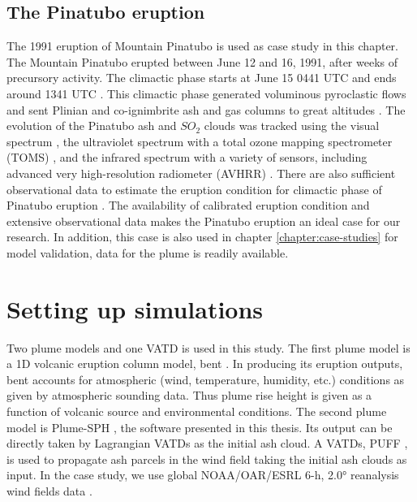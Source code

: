 \subsection{The Pinatubo eruption}

The 1991 eruption of Mountain Pinatubo is used as case study in this chapter. The Mountain Pinatubo erupted between June 12 and 16, 1991, after weeks of precursory activity. The climactic phase starts at June 15 0441 UTC and ends around 1341 UTC \citep{holasek1996satellite}. This climactic phase generated voluminous pyroclastic flows and sent Plinian and co-ignimbrite ash and gas columns to great altitudes \citep{scott1996pyroclastic}. The evolution of the Pinatubo ash and $SO_2$ clouds was tracked using the visual spectrum \citep{holasek1996satellite}, the ultraviolet spectrum with a total ozone mapping spectrometer (TOMS) \citep{guo2004re}, and the infrared spectrum with a variety of sensors, including advanced very high-resolution radiometer (AVHRR) \citep{guo2004particles}. There are also sufficient observational data to estimate the eruption condition for climactic phase of Pinatubo eruption \citep{suzuki2009three}. The availability of calibrated eruption condition and extensive observational data makes the Pinatubo eruption an ideal case for our research. In addition, this case is also used in chapter \ref{chapter:case-studies} for model validation, data for the plume is readily available.

\section{Setting up simulations} \label{sec:Methodology}

Two plume models and one VATD is used in this study.
The first plume model is a 1D volcanic eruption column model, bent \citep{bursik2001effect}. In producing its eruption outputs, bent accounts for atmospheric (wind, temperature, humidity, etc.) conditions as given by atmospheric sounding data. Thus plume rise height is given as a function of volcanic source and environmental conditions. The second plume model is Plume-SPH \citep{gmd-2017-119}, the software presented in this thesis. Its output can be directly taken by Lagrangian VATDs as the initial ash cloud. A VATDs, PUFF \citep{tanaka1991development,searcy1998puff}, is used to propagate ash parcels in the wind field taking the initial ash clouds as input. In the case study, we use global NOAA/OAR/ESRL 6-h, 2.0° reanalysis wind fields data \citep{whitaker2004reanalysis, compo2006feasibility, compo2011twentieth}.

